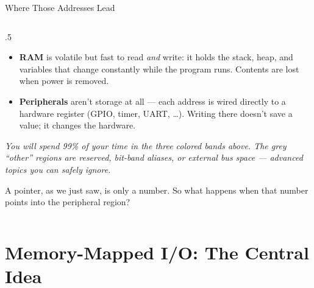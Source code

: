\documentclass[9pt,aspectratio=169,xcolor=table]{beamer}
\begin{document}
\begin{frame}{Where Those Addresses Lead}
\begin{columns}[c]
\begin{column}{.5\textwidth}
{\begin{itemize}
					\item \textbf{RAM} is \alert{volatile} but fast to read
					\emph{and} write: it holds the stack, heap, and variables
					that change constantly while the program runs. Contents
					are lost when power is removed.

					\item \textbf{Peripherals} aren't storage at all --- each
					address is wired directly to a hardware register (GPIO,
					timer, UART, \ldots). Writing there doesn't save a value;
					it \alert{changes the hardware}.
				\end{itemize}

				\vspace{2mm}
				{\footnotesize\itshape You will spend 99\% of your time
				in the three colored bands above. The grey ``other''
				regions are reserved, bit-band aliases, or external bus
				space --- advanced topics you can safely ignore.}

				\vspace{2mm}
				A pointer, as we just saw, is only a number. So what
				happens when that number points into the peripheral
				region?
			}
		\end{column}
	\end{columns}
\end{frame}

\section{Memory-Mapped I/O: The Central Idea}
\end{document}
